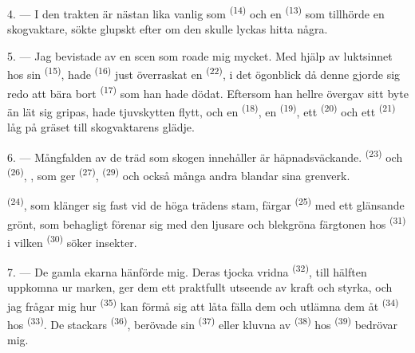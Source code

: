 4. --- I den trakten är  nästan lika vanlig som
 \textsuperscript{(14)} och en 
\textsuperscript{(13)} som tillhörde en skogvaktare, sökte glupskt efter om den skulle lyckas
hitta några.

\VUsaut{3.0mm}
\VUsaut{3.0mm}

5. --- Jag bevistade  av en scen som roade mig mycket. Med hjälp av luktsinnet
hos sin  \textsuperscript{(15)}, hade
 \textsuperscript{(16)} just överraskat en
 \textsuperscript{(22)}, i det ögonblick då denne gjorde sig
redo att bära bort  \textsuperscript{(17)} som han hade dödat. Eftersom
han hellre övergav sitt byte än lät sig gripas, hade tjuvskytten flytt, och en 
\textsuperscript{(18)}, en  \textsuperscript{(19)}, ett 
\textsuperscript{(20)} och ett
 \textsuperscript{(21)} låg på gräset till skogvaktarens glädje.

6. --- Mångfalden av de träd som skogen innehåller är häpnadsväckande.
 \textsuperscript{(23)} och 
\textsuperscript{(26)}, , som ger  \textsuperscript{(27)},
 \textsuperscript{(29)} och också många andra blandar sina grenverk.

 \textsuperscript{(24)}, som klänger sig fast vid de höga
trädens stam, färgar  \textsuperscript{(25)} med ett glänsande grönt, som
behagligt förenar sig med den ljusare och blekgröna färgtonen hos
 \textsuperscript{(31)} i vilken 
\textsuperscript{(30)} söker insekter.

\VUsaut{3.0mm}
\VUsaut{3.0mm}

7. --- De gamla ekarna hänförde mig. Deras tjocka vridna 
\textsuperscript{(32)}, till hälften uppkomna ur marken, ger dem ett praktfullt utseende av
kraft och styrka, och jag frågar mig hur  \textsuperscript{(35)} kan förmå sig
att låta fälla dem och utlämna dem åt
 \textsuperscript{(34)} hos 
\textsuperscript{(33)}. De stackars  \textsuperscript{(36)}, berövade sin
 \textsuperscript{(37)} eller kluvna av
 \textsuperscript{(38)} hos 
\textsuperscript{(39)} bedrövar mig.

